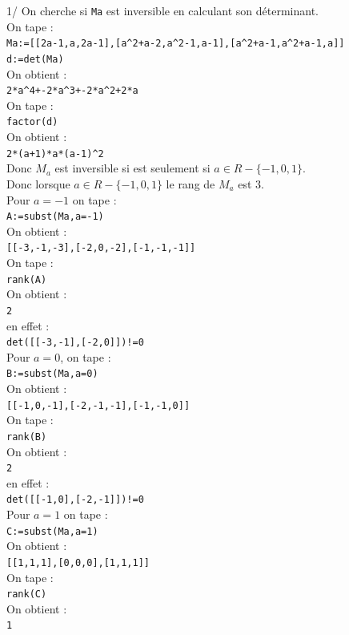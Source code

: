 \documentclass[a4paper,11pt]{book}
\begin{document}
1/ On cherche si {\tt Ma} est inversible en calculant son d\'eterminant.\\
 On tape :\\
{\tt Ma:=[[2a-1,a,2a-1],[a\verb|^|2+a-2,a\verb|^|2-1,a-1],[a\verb|^|2+a-1,a\verb|^|2+a-1,a]]}\\
{\tt d:=det(Ma)}\\
On obtient :\\
{\tt 2*a\verb|^|4+-2*a\verb|^|3+-2*a\verb|^|2+2*a}\\
On tape :\\
{\tt factor(d)}\\
On obtient :\\
{\tt 2*(a+1)*a*(a-1)\verb|^|2}\\
Donc $M_a$ est inversible si est seulement si $a \in R-\{-1,0,1\}$.\\
Donc lorsque $a \in R-\{-1,0,1\}$ le rang de  $M_a$ est 3.\\
Pour $a=-1$ on tape :\\
{\tt A:=subst(Ma,a=-1)}\\
On obtient :\\
{\tt [[-3,-1,-3],[-2,0,-2],[-1,-1,-1]]}\\
On tape :\\
{\tt rank(A)}\\
On obtient :\\
{\tt 2}\\
en effet :\\
{\tt det([[-3,-1],[-2,0]])!=0}\\
Pour $a=0$, on tape :\\
{\tt B:=subst(Ma,a=0)}\\
On obtient :\\
{\tt [[-1,0,-1],[-2,-1,-1],[-1,-1,0]]}\\
On tape :\\
{\tt rank(B)}\\
On obtient :\\
{\tt 2}\\
en effet :\\
{\tt det([[-1,0],[-2,-1]])!=0}\\
Pour $a=1$ on tape :\\
{\tt C:=subst(Ma,a=1)}\\
On obtient :\\
{\tt [[1,1,1],[0,0,0],[1,1,1]]}\\
On tape :\\
{\tt rank(C)}\\
On obtient :\\
{\tt 1}\\
\end{document}
